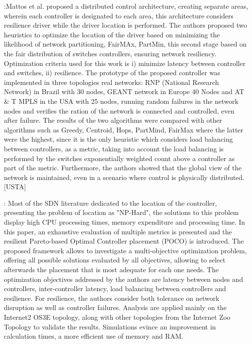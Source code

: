 \documentclass[a4paper,10pt]{article}
\begin{document}
\cite{MaDu16}:Mattos et al. proposed a distributed control architecture, creating separate areas, wherein each controller is designated to each area, this architecture considers resilience driver while the driver location is performed. The authors proposed two heuristics to optimize the location of the driver based on minimizing the likelihood of network partitioning, FairMAx, PartMin, this second stage based on the fair distribution of switches controllers, ensuring network resiliency. Optimization criteria used for this work is i) minimize latency between controller and switches, ii) resilience. The prototype of the proposed controller was implemented in three topologies real networks: RNP (National Research Network) in Brazil with 30 nodes, GEANT network in Europe 40 Nodes and AT & T MPLS in the USA with 25 nodes, running random failures in the network nodes and verifies the ration of the network is connected and controlled, even after failure. The results of the two algorithms were compared with other algorithms such as Greedy, Centroid, Hops, PartMind, FairMax where the latter were the highest, since it is the only heuristic which considers load balancing between controllers, as a metric, taking into account the load balancing is performed by the switches exponentially weighted count above a controller as part of the metric. Furthermore, the authors showed that the global view of the network is maintained, even in a scenario where control is physically distributed.[USTA]

\cite{HoHa13}: Most of the SDN literature dedicated to the location of the controller, presenting the problem of location as "NP-Hard", the solutions to this problem display high CPU processing times, memory expenditure and processing time.
In this paper, an exhaustive evaluation of multiple metrics is presented and the resilient Pareto-based Optimal Controller placement (POCO) is introduced. The proposed framework allows to investigate a multi-objective optimization problem, offering all possible solutions evaluated by all objectives, allowing to select afterwards the placement that is most adequate for each one needs. The optimization objectives addressed by the authors are latency between nodes and controllers, inter-controller latency, load balancing between controllers and resilience. For resilience, the authors consider both tolerance on network disruption as well as controller failures. Analysis are applied mainly on the Internet2 OS3E topology, along with other topologies from the Internet Zoo Topology to validate the results. Simulations evince an improvement in calculation times, a more efficient use of memory and RAM.
\end{document}
